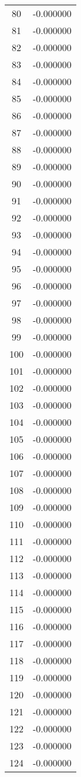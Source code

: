 \documentclass[12pt]{article}
\begin{document}
\begin{longtable}{@{}cc@{}}
80 & -0.000000 \\
81 & -0.000000 \\
82 & -0.000000 \\
83 & -0.000000 \\
84 & -0.000000 \\
85 & -0.000000 \\
86 & -0.000000 \\
87 & -0.000000 \\
88 & -0.000000 \\
89 & -0.000000 \\
90 & -0.000000 \\
91 & -0.000000 \\
92 & -0.000000 \\
93 & -0.000000 \\
94 & -0.000000 \\
95 & -0.000000 \\
96 & -0.000000 \\
97 & -0.000000 \\
98 & -0.000000 \\
99 & -0.000000 \\
100 & -0.000000 \\
101 & -0.000000 \\
102 & -0.000000 \\
103 & -0.000000 \\
104 & -0.000000 \\
105 & -0.000000 \\
106 & -0.000000 \\
107 & -0.000000 \\
108 & -0.000000 \\
109 & -0.000000 \\
110 & -0.000000 \\
111 & -0.000000 \\
112 & -0.000000 \\
113 & -0.000000 \\
114 & -0.000000 \\
115 & -0.000000 \\
116 & -0.000000 \\
117 & -0.000000 \\
118 & -0.000000 \\
119 & -0.000000 \\
120 & -0.000000 \\
121 & -0.000000 \\
122 & -0.000000 \\
123 & -0.000000 \\
124 & -0.000000 \\

\end{longtable}
\end{document}
